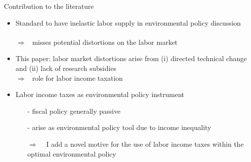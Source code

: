 \documentclass[11pt,aspectratio=169]{beamer}
\newcommand{\ar}{$\Rightarrow$ \ }
\begin{document}
\begin{frame}{Contribution to the literature}
\begin{itemize}[<+->]
			\item \alert{Standard to have inelastic labor supply in environmental policy discussion}\\  \footnotesize{ \citep{Acemoglu2012TheChange, Golosov2014OptimalEquilibrium, Acemoglu2016TransitionTechnology, Fried2018ClimateAnalysis, Hart2019TheEconomists}}
			\\  \normalsize{\alert{\ar misses potential distortions on the labor market}}
				\vspace{2mm}
				\item \alert{This paper}: labor market distortions arise from (i) directed technical change and (ii) lack of research subsidies \footnotesize{\citep{Acemoglu2012TheChange}}
			 \\ \normalsize{\alert{\ar role for labor income taxation}}
			 \vspace{2mm}
	\item \alert{Labor income taxes as environmental policy instrument}
	\begin{itemize}
		\item[-]  fiscal policy generally passive \footnotesize{ \citep{ LansBovenberg1994EnvironmentalTaxation, Goulder1995EnvironmentalGuide, Barrage2019OptimalPolicy}}
		\item[-] arise as environmental policy tool due to income inequality \footnotesize{\citep{Jacobs2019RedistributionCurves, Dobkowitz2022, Douenne2022OptimalHouseholds}}
		\item[\ar] I add a novel motive for the use of labor income taxes within the optimal environmental policy
	\end{itemize}

\end{itemize}
\end{frame}
\end{document}
